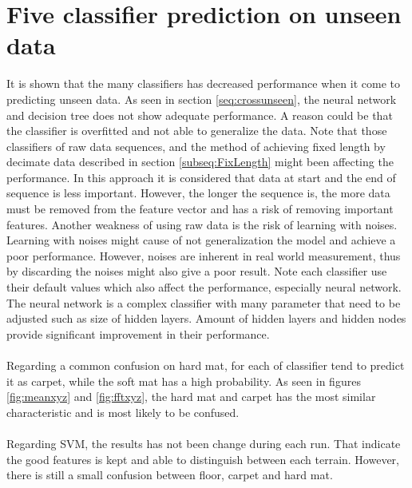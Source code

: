 \documentclass[USenglish]{ifimaster}  %
\begin{document}
\section{Five classifier prediction on unseen data}
It is shown that the many classifiers has decreased performance when it come to predicting unseen data. As seen in section \ref{seq:crossunseen}, the neural network and decision tree does not show adequate performance. A reason could be that the classifier is overfitted and not able to generalize the data. Note that those classifiers of raw data sequences, and the method of achieving fixed length by decimate data described in section \ref{subseq:FixLength} might been affecting the performance. In this approach it is considered that data at start and the end of sequence is less important. However, the longer the sequence is, the more data must be removed from the feature vector and has a risk of removing important features. Another weakness of using raw data is the risk of learning with noises. Learning with noises might cause of not generalization the model and achieve a poor performance. However, noises are inherent in real world measurement, thus by discarding the noises might also give a poor result. Note each classifier use their default values which also affect the performance, especially neural network. The neural network is a complex classifier with many parameter that need to be adjusted such as size of hidden layers. Amount of hidden layers and hidden nodes provide significant improvement in their performance.  
\\
\\
Regarding a common confusion on hard mat, for each of classifier tend to predict it as carpet, while the soft mat has a high probability. As seen in figures \ref{fig:meanxyz} and \ref{fig:fftxyz}, the hard mat and carpet has the most similar characteristic and is most likely to be confused.
\\
\\
Regarding SVM, the results has not been change during each run. That indicate the good features is kept and able to distinguish between each terrain. However, there is still a small confusion between floor, carpet and hard mat. 
	
\end{document}

